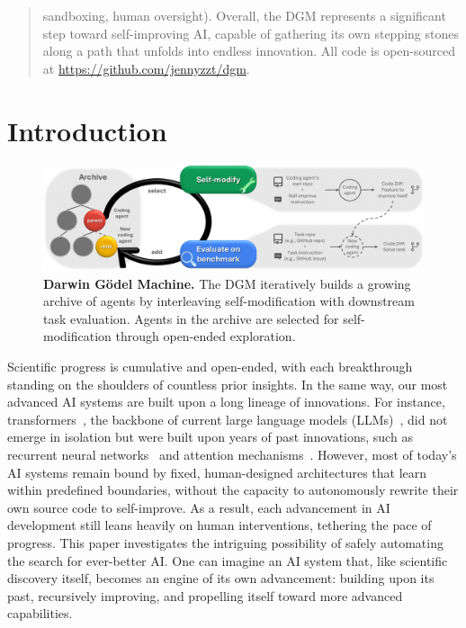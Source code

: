 \documentclass{article}
\begin{document}
\begin{abstract}
sandboxing, human oversight). Overall, the DGM represents a significant step toward self-improving AI, capable of gathering its own stepping stones along a path that unfolds into endless innovation. All code is open-sourced at \href{https://github.com/jennyzzt/dgm}{https://github.com/jennyzzt/dgm}.
\end{abstract}

\section{Introduction}
\label{sec:intro}

\begin{figure}[t!]
\centering
\includegraphics[width=\textwidth]{figures/conceptual.pdf}
\caption{\textbf{Darwin G\"odel Machine.} The DGM iteratively builds a growing archive of agents by interleaving self-modification with downstream task evaluation. Agents in the archive are selected for self-modification through open-ended exploration.}
\vspace{-0.3cm}
\label{fig:conceptual}
\end{figure}

Scientific progress is cumulative and open-ended, with each breakthrough standing on the shoulders of countless prior insights. In the same way, our most advanced AI systems are built upon a long lineage of innovations. For instance, transformers~\citep{vaswani2017attention}, the backbone of current large language models (LLMs)~\citep{brown2020language}, did not emerge in isolation but were built upon years of past innovations, such as recurrent neural networks~\citep{rumelhart1985learning, hopfield1982neural} and attention mechanisms~\citep{bahdanau2015neural, kim2017structured, parikh2016decomposable}. However, most of today’s AI systems remain bound by fixed, human-designed architectures that learn within predefined boundaries, without the capacity to autonomously rewrite their own source code to self-improve. As a result, each advancement in AI development still leans heavily on human interventions, tethering the pace of progress. This paper investigates the intriguing possibility of safely automating the search for ever-better AI. One can imagine an AI system that, like scientific discovery itself, becomes an engine of its own advancement: building upon its past, recursively improving, and propelling itself toward more advanced capabilities.
\end{document}
